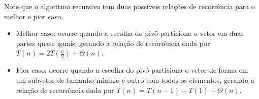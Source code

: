 Note que o algoritmo recursivo tem duas possíveis relações de recorrência para o melhor e pior caso. \\
\begin{itemize}
  \item Melhor caso: ocorre quando a escolha do pivô particiona o vetor em duas partes quase iguais, gerando a relação de recorrência dada por $T(n) = 2T(\frac{n}{2}) + \Theta(n)$.
  \item Pior caso: ocorre quando a escolha do pivô particiona o vetor de forma em um subvetor de tamanho mínimo e outro com todos os elementos, gerando a relação de recorrência dada por $T(n) = T(n - 1) + T(1) + \Theta(n)$.
\end{itemize}





